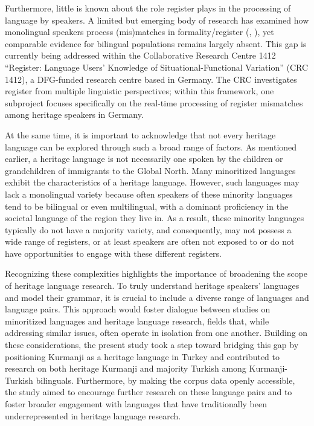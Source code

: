 Furthermore, little is known about the role register plays in the processing of language by speakers. A limited but emerging body of research has examined how monolingual speakers process (mis)matches in formality/register (\citealt{MaquateEtAl2025}, \citealt{PescumaEtAl2024}), yet comparable evidence for bilingual populations remains largely absent. This gap is currently being addressed within the Collaborative Research Centre 1412 “Register: Language Users’ Knowledge of Situational-Functional Variation” (CRC 1412), a DFG-funded research centre based in Germany. The CRC investigates register from multiple linguistic perspectives; within this framework, one subproject focuses specifically on the real-time processing of register mismatches among heritage speakers in Germany.

At the same time, it is important to acknowledge that not every heritage language can be explored through such a broad range of factors. As mentioned earlier, a heritage language is not necessarily one spoken by the children or grandchildren of immigrants to the Global North. Many minoritized languages exhibit the characteristics of a heritage language. However, such languages may lack a monolingual variety because often speakers of these minority languages tend to be bilingual or even multilingual, with a dominant proficiency in the societal language of the region they live in. As a result, these minority languages typically do not have a majority variety, and consequently, may not possess a wide range of registers, or at least speakers are often not exposed to or do not have opportunities to engage with these different registers.

Recognizing these complexities highlights the importance of broadening the scope of heritage language research. To truly understand heritage speakers' languages and model their grammar, it is crucial to include a diverse range of languages and language pairs. This approach would foster dialogue between studies on minoritized languages and heritage language research, fields that, while addressing similar issues, often operate in isolation from one another. Building on these considerations, the present study took a step toward bridging this gap by positioning Kurmanji as a heritage language in Turkey and contributed to research on both heritage Kurmanji and majority Turkish among Kurmanji-Turkish bilinguals. Furthermore, by making the corpus data openly accessible, the study aimed to encourage further research on these language pairs and to foster broader engagement with languages that have traditionally been underrepresented in heritage language research.
